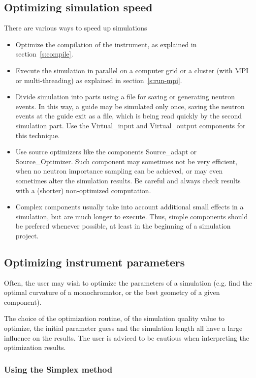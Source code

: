 \subsection{Optimizing simulation speed}
\label{s:optim}
There are various ways to speed up simulations
\begin{itemize}
\item Optimize the compilation of the instrument, as explained in section~\ref{s:compile}.
\item Execute the simulation in parallel on a computer grid or a cluster (with MPI or multi-threading) as explained in section~\ref{s:run-mpi}.
\item Divide simulation into parts using a file for saving or generating neutron
      events. In this way, a guide may be simulated only once, saving the neutron events
      at the guide exit as a file, which is being read quickly by the second simulation
      part. Use the Virtual\_input and Virtual\_output components for this technique.
\item Use source optimizers like the components Source\_adapt or
      Source\_Optimizer. Such component may sometimes not be very efficient, when no
      neutron importance sampling can be achieved, or may even sometimes alter the
      simulation results. Be careful and always check results with a
      (shorter) non-optimized
      computation.
\item Complex components usually take into account additional small effects in a simulation,
      but are much longer to execute. Thus, simple components should be prefered
      whenever possible, at least in the beginning of a simulation project.
\end{itemize}

\subsection{Optimizing instrument parameters}
\label{s:optimize}
Often, the user may wish to optimize the parameters of a simulation (e.g. find the optimal curvature of a monochromator, or the best geometry of a given component).

The choice of the optimization routine, of the simulation quality
value to optimize, the initial parameter guess and the simulation
length all have a large influence on the results.
The user is adviced to be cautious when interpreting the optimization results.

\subsubsection{Using the Simplex method}

